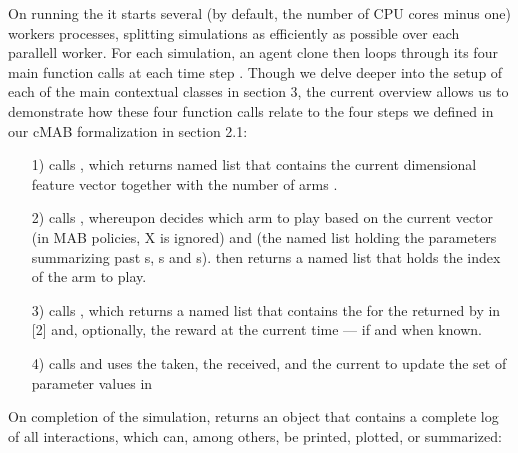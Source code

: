 \documentclass[nojss]{jss}\usepackage[]{graphicx}\usepackage[]{color}
\begin{document}
On running the  it starts several (by default, the number of CPU cores minus one) workers processes, splitting simulations as efficiently as possible over each parallell worker. For each simulation, an agent clone then loops through its four main function calls at each time step . Though we delve deeper into the setup of each of the main contextual classes in section 3, the current overview allows us to demonstrate how these four function calls relate to the four steps we defined in our cMAB formalization in section 2.1:

\begin{enumerate}
         \item[1)]  calls , which returns named list  that contains the current  dimensional  feature vector  together with the number of arms .
         \item[2)]  calls , whereupon  decides which arm to play based on the current  vector  (in MAB policies, X is ignored) and  (the named list holding the parameters summarizing past s, s and s\footnotemark[\value{footnote}]).  then returns a named list  that holds the index of the arm to play.
         \item[3)]  calls , which returns a named list  that contains the  for the  returned by  in [2] and, optionally, the  reward at the current time  --- if and when known.
         \item[4)]  calls  and uses the  taken, the  received, and the current  to update the set of parameter values in 
\end{enumerate}

On completion of the simulation,  returns an  object that contains a complete log of all interactions, which can, among others, be printed, plotted, or summarized:
\end{document}
